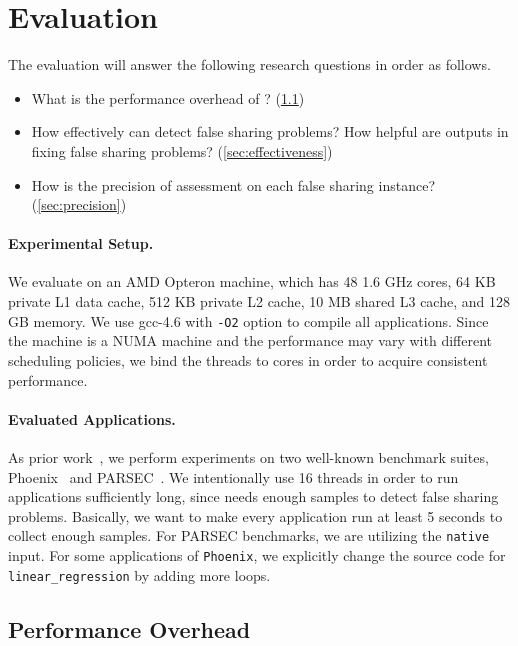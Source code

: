 \section{Evaluation}
\label{sec:eval}

\sloppy{}
The evaluation will answer the following research questions in order as follows. 

\begin{itemize}
\item What is the performance overhead of \cheetah{}? (\ref{sec:perf})

\item How effectively can \cheetah{} detect false sharing problems? How helpful are outputs in fixing false sharing problems? (\ref{sec:effectiveness})

\item How is the precision of assessment on each false sharing instance? (\ref{sec:precision})

\end{itemize}

\paragraph{Experimental Setup.} We evaluate \cheetah{} on an AMD Opteron machine, which has 48 1.6 GHz cores, 64 KB private L1 data cache, 512 KB private L2 cache, 10 MB shared L3 cache, and 128 GB memory. We use gcc-4.6 with {\tt -O2} option to compile all applications. Since the machine is a NUMA machine and the performance may vary with different scheduling policies, we bind the threads to cores in order to acquire consistent performance.   

\paragraph{Evaluated Applications.} As prior work~\cite{Sheriff, Predator, qinzhao, mldetect}, we perform experiments on two well-known benchmark suites, Phoenix~\cite{phoenix-hpca} and PARSEC~\cite{parsec}. We intentionally use 16 threads in order to run applications sufficiently long, since \cheetah{} needs enough samples to detect false sharing problems.  Basically, we want to make every application run at least 5 seconds to collect enough samples. For PARSEC benchmarks, we are utilizing the \texttt{native} input. For some applications of \texttt{Phoenix}, we explicitly change the source code for \texttt{linear\_regression} by adding more loops. 

\subsection{Performance Overhead}
\label{sec:perf}


